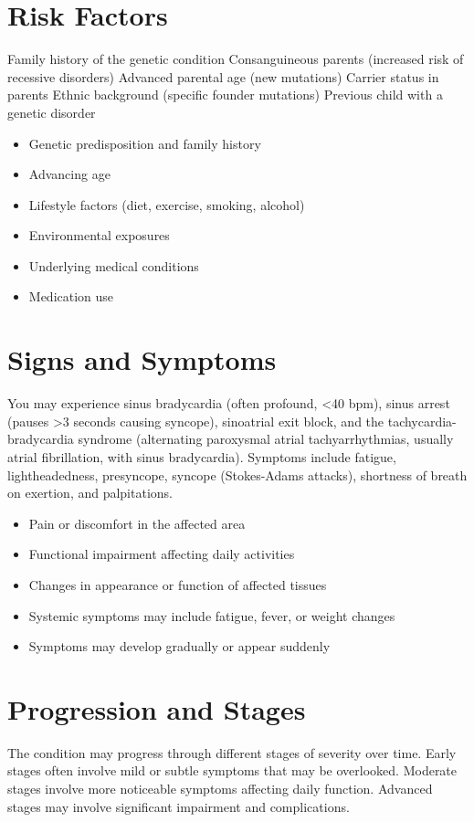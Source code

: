 \section{Risk Factors}
Family history of the genetic condition Consanguineous parents (increased risk of recessive disorders) Advanced parental age (new mutations) Carrier status in parents Ethnic background (specific founder mutations) Previous child with a genetic disorder

\begin{itemize}[noitemsep]
  \item Genetic predisposition and family history
  \item Advancing age
  \item Lifestyle factors (diet, exercise, smoking, alcohol)
  \item Environmental exposures
  \item Underlying medical conditions
  \item Medication use
\end{itemize}
\section{Signs and Symptoms}
You may experience sinus bradycardia (often profound, <40 bpm), sinus arrest (pauses >3 seconds causing syncope), sinoatrial exit block, and the tachycardia-bradycardia syndrome (alternating paroxysmal atrial tachyarrhythmias, usually atrial fibrillation, with sinus bradycardia). Symptoms include fatigue, lightheadedness, presyncope, syncope (Stokes-Adams attacks), shortness of breath on exertion, and palpitations.

\begin{itemize}[noitemsep]
  \item Pain or discomfort in the affected area
  \item Functional impairment affecting daily activities
  \item Changes in appearance or function of affected tissues
  \item Systemic symptoms may include fatigue, fever, or weight changes
  \item Symptoms may develop gradually or appear suddenly
\end{itemize}
\section{Progression and Stages}
The condition may progress through different stages of severity over time. Early stages often involve mild or subtle symptoms that may be overlooked. Moderate stages involve more noticeable symptoms affecting daily function. Advanced stages may involve significant impairment and complications.
